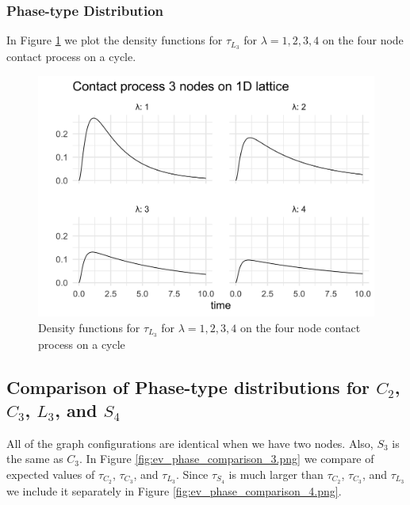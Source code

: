 \documentclass{article}
\theoremstyle{plain}
\theoremstyle{definition}
\theoremstyle{remark}
\numberwithin{equation}{section}
\begin{document}
\subsubsection{Phase-type Distribution}

In Figure \ref{fig:lattice_3_contact_phase_densities} we plot the density functions for $\tau_{L_3}$ for $\lambda = 1, 2, 3, 4$ on the four node contact process on a cycle.

\begin{figure}[H]
  \centering
    \includegraphics[width=.80\textwidth]{figures/lattice_3_contact_phase_densities.png}
   \caption{Density functions for $\tau_{L_3}$ for $\lambda = 1, 2, 3, 4$ on the four node contact process on a cycle}
  \label{fig:lattice_3_contact_phase_densities}
\end{figure}

\subsection{Comparison of Phase-type distributions for \texorpdfstring{$C_2$}{C2}, \texorpdfstring{$C_3$}{C3}, \texorpdfstring{$L_3$}{L3}, and \texorpdfstring{$S_4$}{S4}}

All of the graph configurations are identical when we have two nodes.
Also, $S_3$ is the same as $C_3$.
In Figure \ref{fig:ev_phase_comparison_3.png} we compare of expected values of $\tau_{C_2}$, $\tau_{C_3}$, and $\tau_{L_3}$.
Since $\tau_{S_4}$ is much larger than $\tau_{C_2}$, $\tau_{C_3}$, and $\tau_{L_3}$ we include it separately in Figure \ref{fig:ev_phase_comparison_4.png}.
\end{document}
